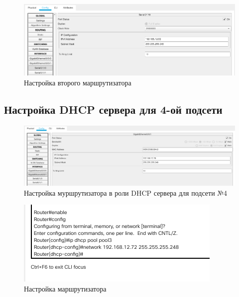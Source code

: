 \documentclass[12pt]{report}
\begin{document}
\begin{figure}[H]
	\begin{center}
		\includegraphics[scale=0.48]{img/10.png}
	\end{center}
	\caption{Настройка второго маршрутизатора}
	\label{fig:10}
\end{figure}

\subsection*{Настройка DHCP сервера для 4-ой подсети}

\begin{figure}[H]
	\begin{center}
		\includegraphics[scale=0.4]{img/11.png}
	\end{center}
	\caption{Настройка муршрутизатора в роли DHCP сервера для подсети №4}
	\label{fig:11}
\end{figure}

\begin{figure}[H]
	\begin{center}
		\includegraphics[scale=0.8]{img/12.png}
	\end{center}
	\caption{Настройка маршрутизатора}
	\label{fig:12}
\end{figure}
\end{document}
